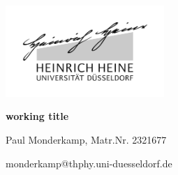 \documentclass[12pt,a4paper]{article}	%
\begin{document}
\setlength{\parindent}{0pt}


\thispagestyle{empty}

\begin{titlepage}
	\centering
	\includegraphics[width=0.45\textwidth]{logo_sw.jpg}\par\vspace{1cm}
	\vspace{1cm}
	\vspace{1.5cm}
	{\LARGE\bfseries working title\\  \par}
	\vspace{1cm}
	
	{\large	Paul Monderkamp, Matr.Nr. 2321677\par}
	\vfill
	

	\vfill

	{\large  monderkamp@thphy.uni-duesseldorf.de \par}
	\vspace{2cm}
\end{titlepage}

\thispagestyle{empty} %
\newpage	%
\end{document}
